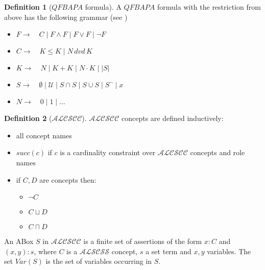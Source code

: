 \documentclass[a4paper,11pt]{scrartcl}
\theoremstyle{break}
\theoremstyle{definition}
\newtheorem{mydef}{Definition}
\begin{document}
\begin{mydef}[$QFBAPA$ formula]
A $QFBAPA$ formula with the restriction from above has the following grammar (see \cite{pa})
\begin{itemize}
\item[] $F\rightarrow \quad C\mid F\wedge F\mid F\vee F\mid  \neg F$
\item[] $C\rightarrow \quad K\leq K\mid N\,dvd\, K$
\item[] $K\rightarrow \quad N\mid K+K\mid N\cdot K\mid |S|$
\item[] $S\rightarrow \quad\emptyset\mid\mathcal{U}\mid S\cap S\mid S\cup S\mid S^\neg\mid x$
\item[] $N\rightarrow \quad 0\mid 1\mid\dots$
\end{itemize}
\end{mydef}
\begin{mydef}[$\mathcal{ALCSCC}$]
$\mathcal{ALCSCC}$ concepts are defined inductively:
\begin{itemize}
\item all concept names
\item $succ(c)$ if $c$ is a cardinality constraint over $\mathcal{ALCSCC}$ concepts and role names
\item if $C,D$ are concepts then:
\begin{itemize}
\item $\neg C$
\item $C\sqcup D$
\item $C\sqcap D$
\end{itemize}
\end{itemize}
\end{mydef}
An ABox $S$ in $\mathcal{ALCSCC}$ is a finite set of assertions of the form $x:C$ and $(x,y):s$, where $C$ is a $\mathcal{ALSCSS}$ concept, $s$ a set term and $x,y$ variables. The set $Var(S)$ is the set of variables occurring in $S$. 
\end{document}
